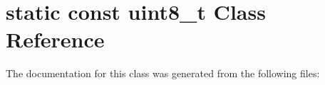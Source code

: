 \hypertarget{classstatic_01const_01uint8__t}{}\section{static const uint8\+\_\+t Class Reference}
\label{classstatic_01const_01uint8__t}


The documentation for this class was generated from the following files\+: